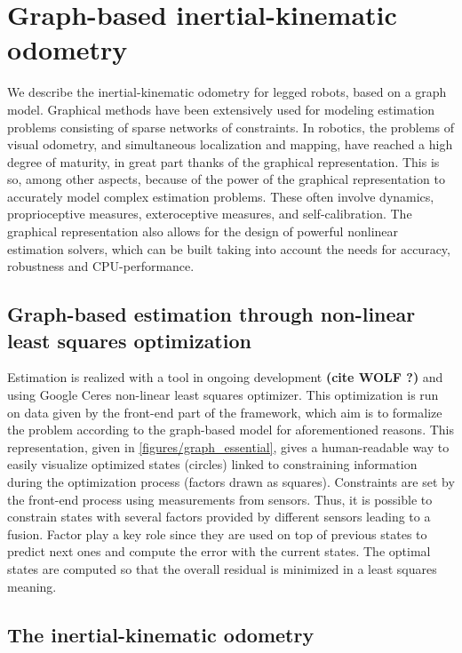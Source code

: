 
\section{Graph-based inertial-kinematic odometry}

We describe the inertial-kinematic odometry for legged robots, based on a graph model. 
Graphical methods have been extensively used for modeling estimation problems consisting of sparse networks of constraints. 
In robotics, the problems of visual odometry, and simultaneous localization and mapping, have reached a high degree of maturity, in great part thanks of the graphical representation. 
This is so, among other aspects, because of the power of the graphical representation to accurately model complex estimation problems. 
These often involve dynamics, proprioceptive measures, exteroceptive measures, and self-calibration. 
The graphical representation also allows for the design of powerful nonlinear estimation solvers, which can be built taking into account the needs for accuracy, robustness and CPU-performance.

\subsection{Graph-based estimation through non-linear least squares optimization}

Estimation is realized with a tool in ongoing development \textbf{(cite WOLF ?)} and using Google Ceres non-linear least squares optimizer. This optimization is run on data given by the front-end part of the framework,
which aim is to formalize the problem according to the graph-based model for aforementioned reasons. This representation, given in \ref{figures/graph_essential}, 
gives a human-readable way to easily visualize optimized states (circles) linked to constraining information during the optimization process (factors drawn as squares). Constraints are set by the front-end process using measurements from sensors.
Thus, it is possible to constrain states with several factors provided by different sensors leading to a fusion. Factor play a key role since they are used on top of previous states to predict next ones and compute the error with the current states.
The optimal states are computed so that the overall residual is minimized in a least squares meaning.

\subsection{The inertial-kinematic odometry}
